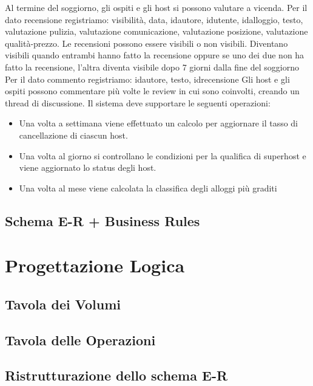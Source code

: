\documentclass[12pt, letterpaper]{report}
\begin{document}
\newline
\newline
Al termine del soggiorno, gli ospiti e gli host si possono valutare a vicenda. 
Per il dato recensione registriamo: visibilità, data, idautore, idutente, 
idalloggio, testo, valutazione pulizia, valutazione comunicazione, valutazione 
posizione, valutazione qualità-prezzo.
\newline
\newline
Le recensioni possono essere visibili o non visibili. Diventano visibili quando
entrambi hanno fatto la recensione oppure se uno dei due non ha fatto la recensione, l’altra
diventa visibile dopo 7 giorni dalla fine del soggiorno
\newline
\newline
Per il dato commento registriamo: idautore, testo, idrecensione
Gli host e gli ospiti possono commentare più volte le review in cui sono coinvolti, 
creando un thread di discussione.
\newline
\newline
Il sistema deve supportare le seguenti operazioni:
\begin{itemize}
    \item Una volta a settimana viene effettuato un calcolo per aggiornare 
    il tasso di cancellazione di ciascun host.
    \item Una volta al giorno si controllano le condizioni per la qualifica di 
    superhost e viene aggiornato lo status degli host.
    \item Una volta al mese viene calcolata la classifica degli alloggi più graditi
\end{itemize}

\section{Schema E-R + Business Rules}

\chapter{Progettazione Logica}
\section{Tavola dei Volumi}
\section{Tavola delle Operazioni}
\section{Ristrutturazione dello schema E-R}
\end{document}
